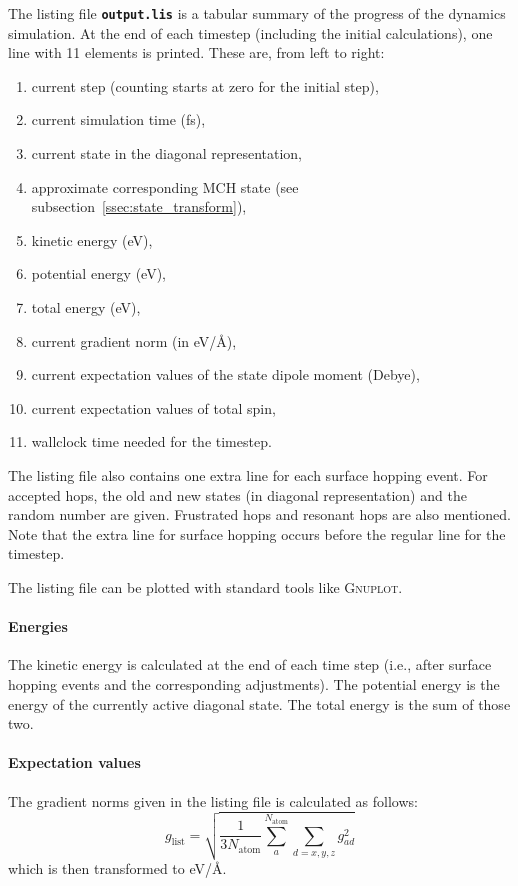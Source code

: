 \documentclass[a4paper,11pt,DIV=15,openany,twoside=false]{scrbook}
\newcommand{\ttt}[1]{\textbf{\texttt{#1}}}
\begin{document}
The listing file \ttt{output.lis} is a tabular summary of the progress of the dynamics simulation. At the end of each timestep (including the initial calculations), one line with 11 elements is printed. These are, from left to right:
\begin{enumerate}
  \item current step (counting starts at zero for the initial step),
  \item current simulation time (fs),
  \item current state in the diagonal representation,
  \item approximate corresponding MCH state (see subsection~\ref{ssec:state_transform}),
  \item kinetic energy (eV),
  \item potential energy (eV),
  \item total energy (eV),
  \item current gradient norm (in eV/\AA),
  \item current expectation values of the state dipole moment (Debye),
  \item current expectation values of total spin,
  \item wallclock time needed for the timestep.
\end{enumerate}
The listing file also contains one extra line for each surface hopping event. For accepted hops, the old and new states (in diagonal representation) and the random number are given. Frustrated hops and resonant hops are also mentioned. Note that the extra line for surface hopping occurs before the regular line for the timestep. 

The listing file can be plotted with standard tools like \textsc{Gnuplot}. 

\paragraph{Energies}

The kinetic energy is calculated at the end of each time step (i.e., after surface hopping events and the corresponding adjustments). The potential energy is the energy of the currently active diagonal state. The total energy is the sum of those two.

\paragraph{Expectation values}

The gradient norms given in the listing file is calculated as follows:
\begin{equation}
  g_\text{list}=\sqrt{\frac{1}{3N_\text{atom}}\sum\limits_a^{N_\text{atom}}\sum_{d=x,y,z} g_{ad}^2}
\end{equation}
which is then transformed to eV/\AA.
\end{document}
